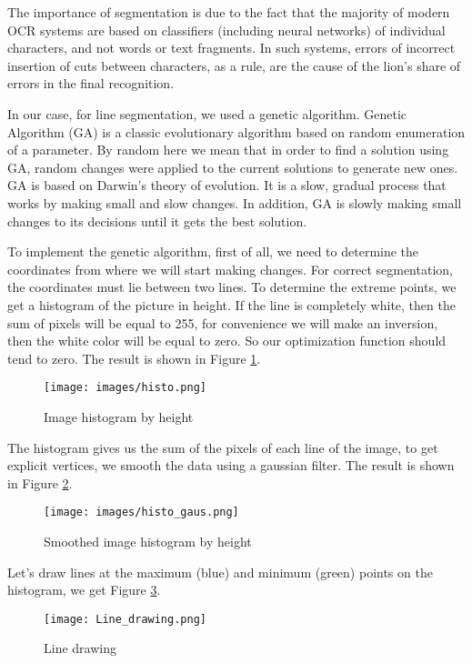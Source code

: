 \documentclass[preprint,12pt]{elsarticle}
\begin{document}
The importance of segmentation is due to the fact that the majority of modern OCR systems are based on classifiers (including neural networks) of individual characters, and not words or text fragments. In such systems, errors of incorrect insertion of cuts between characters, as a rule, are the cause of the lion's share of errors in the final recognition.

In our case, for line segmentation, we used a genetic algorithm. Genetic Algorithm (GA) is a classic evolutionary algorithm based on random enumeration of a parameter. By random here we mean that in order to find a solution using GA, random changes were applied to the current solutions to generate new ones. GA is based on Darwin's theory of evolution. It is a slow, gradual process that works by making small and slow changes. In addition, GA is slowly making small changes to its decisions until it gets the best solution.

To implement the genetic algorithm, first of all, we need to determine the coordinates from where we will start making changes. For correct segmentation, the coordinates must lie between two lines. To determine the extreme points, we get a histogram of the picture in height.
If the line is completely white, then the sum of pixels will be equal to 255, for convenience we will make an inversion, then the white color will be equal to zero. So our optimization function should tend to zero. The result is shown in Figure \ref{fig:segm1}.

\begin{figure}[!ht]
    \centering
    \texttt{[image: images/histo.png]}
    \caption{Image histogram by height}
    \label{fig:segm1}
\end{figure}

The histogram gives us the sum of the pixels of each line of the image, to get explicit vertices, we smooth the data using a gaussian filter. The result is shown in Figure \ref{fig:segm2}.
\begin{figure}[!ht]
    \centering
    \texttt{[image: images/histo\_gaus.png]}
    \caption{Smoothed image histogram by height}
    \label{fig:segm2}
\end{figure}
Let's draw lines at the maximum (blue) and minimum (green) points on the histogram, we get Figure \ref{fig:segm3}.
\begin{figure}[!ht]
    \centering
    \texttt{[image: Line\_drawing.png]}
    \caption{Line drawing}
    \label{fig:segm3}
\end{figure}
\end{document}
